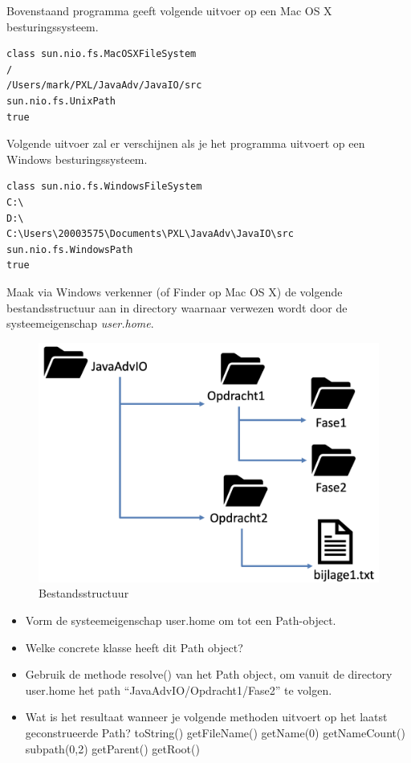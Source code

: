Bovenstaand programma geeft volgende uitvoer op een Mac OS X besturingssysteem.

\begin{verbatim}
class sun.nio.fs.MacOSXFileSystem
/
/Users/mark/PXL/JavaAdv/JavaIO/src
sun.nio.fs.UnixPath
true
\end{verbatim}

Volgende uitvoer zal er verschijnen als je het programma uitvoert op een Windows besturingssysteem.

\begin{verbatim}
class sun.nio.fs.WindowsFileSystem
C:\
D:\
C:\Users\20003575\Documents\PXL\JavaAdv\JavaIO\src
sun.nio.fs.WindowsPath
true
\end{verbatim}


\begin{oefening}
Maak via Windows verkenner (of Finder op Mac OS X) de volgende bestandsstructuur aan in directory waarnaar verwezen wordt door de systeemeigenschap \textit{user.home}.

\begin{figure}[H]
  \includegraphics[width=\linewidth]{images/h8/opgave1.png}
  \caption{Bestandsstructuur}
  \label{fig:paths}
\end{figure}

\begin{itemize}
\item Vorm de systeemeigenschap user.home om tot een Path-object.
\item Welke concrete klasse heeft dit Path object?
\item Gebruik de methode resolve() van het Path object, om vanuit de directory user.home het path ``JavaAdvIO/Opdracht1/Fase2'' te volgen.
\item Wat is het resultaat wanneer je volgende methoden uitvoert op het laatst geconstrueerde Path?
\subitem toString()
\subitem getFileName()
\subitem getName(0)
\subitem getNameCount()
\subitem subpath(0,2)
\subitem getParent()
\subitem getRoot()
\end{itemize}
\end{oefening}




